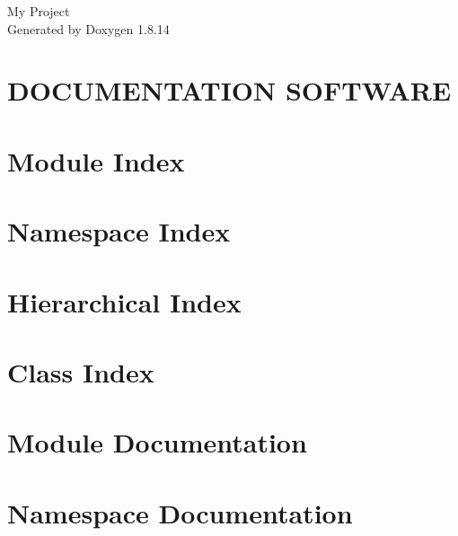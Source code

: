 \documentclass[twoside]{book}
\newcommand{\+}{\discretionary{\mbox{\scriptsize$\hookleftarrow$}}{}{}}
\newcommand{\clearemptydoublepage}{%
  \newpage{\pagestyle{empty}\cleardoublepage}%
}
\begin{document}
\hypersetup{pageanchor=false,
             bookmarksnumbered=true,
             pdfencoding=unicode
            }
\begin{titlepage}
\vspace*{7cm}
\begin{center}%
{\Large My Project }\\
\vspace*{1cm}
{\large Generated by Doxygen 1.8.14}\\
\end{center}
\end{titlepage}
\clearemptydoublepage
{}
\tableofcontents
\clearemptydoublepage
{}
\hypersetup{pageanchor=true}

\chapter{D\+O\+C\+U\+M\+E\+N\+T\+A\+T\+I\+ON S\+O\+F\+T\+W\+A\+RE}
\label{index}\hypertarget{index}{}
\chapter{Module Index}

\chapter{Namespace Index}

\chapter{Hierarchical Index}

\chapter{Class Index}

\chapter{Module Documentation}


\chapter{Namespace Documentation}


\end{document}
